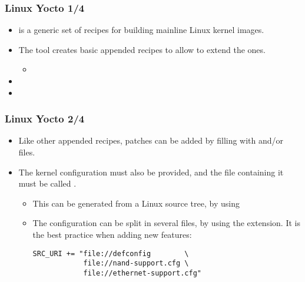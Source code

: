 \begin{frame}
  \frametitle{Linux Yocto 1/4}
  \begin{itemize}
    \item {} is a generic set of recipes for building
      mainline Linux kernel images.
    \item The  tool creates basic appended recipes to
      allow to extend the  ones.
      \begin{itemize}
        \item {}
      \end{itemize}
    \item {}
    \item {}
  \end{itemize}
\end{frame}

\begin{frame}[fragile]
  \frametitle{Linux Yocto 2/4}
  \begin{itemize}
    \item Like other appended recipes, patches can be added by filling
       with  and/or  files.
    \item The kernel configuration must also be provided, and the file
      containing it must be called .
      \begin{itemize}
        \item This can be generated from a Linux source tree, by using
        \item The configuration can be split in several files, by
          using the  extension. It is the best practice
          when adding new features:
          \begin{block}{}
            \begin{verbatim}
SRC_URI += "file://defconfig        \
            file://nand-support.cfg \
            file://ethernet-support.cfg"
            \end{verbatim}
          \end{block}
      \end{itemize}
  \end{itemize}
\end{frame}

